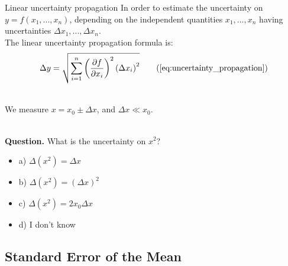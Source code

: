 \documentclass[9pt, xcolor=dvipsnames]{beamer}
\begin{document}
\begin{frame}{Linear uncertainty propagation}
	\justify
	In order to estimate the uncertainty on $y = f(x_1, ..., x_n)$, depending on the independent quantities $x_1, ..., x_n$ having uncertainties $\Delta x_1, ..., \Delta x_n$.\\
	The linear uncertainty propagation formula is:
	\begin{equation}
	\Delta y = \sqrt{ \sum_{i=1}^{n} \left(\frac{\partial f}{\partial x_i}\right)^2 \left(\Delta x_i\right)^2 } \tag{\ref{eq:uncertainty_propagation}}
	\end{equation}
	
	~\\
	We measure $x = x_0  \pm \Delta x$, and $\Delta x \ll x_0$.
	
	~\\
	\textbf{Question.} What is the uncertainty on $x^2$?
	\begin{itemize}
		\color{lightgray}
		\item[] a) $\Delta \left(x^2\right) = \Delta x$
		\item[] b) $\Delta \left(x^2\right) = \left(\Delta x\right)^2$
		\color{black}
		\item[] c) $\Delta \left(x^2\right) = 2 x_0 \Delta x$
		\color{lightgray}
		\item[] d) I don't know
	\end{itemize}
	

	
\end{frame}

\subsection{Standard Error of the Mean}
\end{document}
